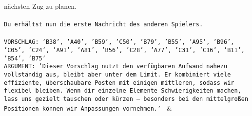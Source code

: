 \documentclass{article}
\begin{document}
{{{nächsten Zug zu planen.\\ \tt \\ \tt Du erhältst nun die erste Nachricht des anderen Spielers.\\ \tt \\ \tt VORSCHLAG: {'B38', 'A40', 'B59', 'C50', 'B79', 'B55', 'A95', 'B96', 'C05', 'C24', 'A91', 'A81', 'B56', 'C28', 'A77', 'C31', 'C16', 'B11', 'B54', 'B75'}\\ \tt ARGUMENT: {'Dieser Vorschlag nutzt den verfügbaren Aufwand nahezu vollständig aus, bleibt aber unter dem Limit. Er kombiniert viele effiziente, überschaubare Posten mit einigen mittleren, sodass wir flexibel bleiben. Wenn dir einzelne Elemente Schwierigkeiten machen, lass uns gezielt tauschen oder kürzen – besonders bei den mittelgroßen Positionen können wir Anpassungen vornehmen.'} 
	  } 
	   } 
	   } 
	 & \\ 
 

    \theutterance {}  
\end{document}
